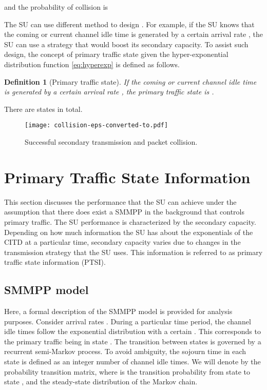 \documentclass[10pt,final,journal,letterpaper]{IEEEtran}
\newtheorem{definition}{Definition}
\begin{document}
and the probability of collision is

The SU can use different method to design . For example, if the SU knows that the coming or current channel idle time is generated by a certain arrival rate , the SU can use a strategy that would boost its secondary capacity. To assist such design, the concept of primary traffic state given the hyper-exponential distribution function \ref{eq:hyperexp} is defined as follows.
\begin{definition}[Primary traffic state]
If the coming or current channel idle time is generated by a certain arrival rate , the primary traffic state is .
\end{definition}
There are  states in total.
\begin{figure}[!t]
\centering
\texttt{[image: collision-eps-converted-to.pdf]}
\caption{Successful secondary transmission and packet collision.}
\label{fig:collision}
\end{figure}

\section{Primary Traffic State Information}\label{sec:4}
This section discusses the performance that the SU can achieve under the assumption that there does exist a SMMPP in the background that controls primary traffic. The SU performance is characterized by the secondary capacity. Depending on how much information the SU has about the exponentials of the CITD at a particular time, secondary capacity varies due to changes in the transmission strategy that the SU uses. This information is referred to as primary traffic state information (PTSI).
\subsection{SMMPP model}
Here, a formal description of the SMMPP model is provided for analysis purposes. Consider  arrival rates . During a particular time period, the channel idle times follow the exponential distribution with a certain . This corresponds to the primary traffic being in state . The transition between states is governed by a recurrent semi-Markov process. To avoid ambiguity, the sojourn time in each state is defined as an integer number of channel idle times. We will denote by  the probability transition matrix, where  is the transition probability from state  to state , and  the steady-state distribution of the Markov chain.
\end{document}
